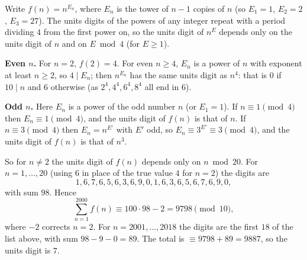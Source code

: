 Write $f(n)=n^{E_n}$, where $E_n$ is the tower of $n-1$ copies of $n$ (so $E_1=1$, $E_2=2$, $E_3=27$). The units digits of the powers of any integer repeat with a period dividing $4$ from the first power on, so the units digit of $n^{E}$ depends only on the units digit of $n$ and on $E\bmod4$ (for $E\ge1$).

\textbf{Even $n$.} For $n=2$, $f(2)=4$. For even $n\ge4$, $E_n$ is a power of $n$ with exponent at least $n\ge2$, so $4\mid E_n$; then $n^{E_n}$ has the same units digit as $n^4$: that is $0$ if $10\mid n$ and $6$ otherwise (as $2^4,4^4,6^4,8^4$ all end in $6$).

\textbf{Odd $n$.} Here $E_n$ is a power of the odd number $n$ (or $E_1=1$). If $n\equiv1\pmod4$ then $E_n\equiv1\pmod4$, and the units digit of $f(n)$ is that of $n$. If $n\equiv3\pmod4$ then $E_n=n^{E'}$ with $E'$ odd, so $E_n\equiv3^{E'}\equiv3\pmod4$, and the units digit of $f(n)$ is that of $n^3$.

So for $n\ne2$ the units digit of $f(n)$ depends only on $n\bmod20$. For $n=1,\dots,20$ (using $6$ in place of the true value $4$ for $n=2$) the digits are
\[
1,6,7,6,5,6,3,6,9,0,1,6,3,6,5,6,7,6,9,0,
\]
with sum $98$. Hence
\[
\sum_{n=1}^{2000}f(n)\equiv100\cdot98-2=9798\pmod{10},
\]
where $-2$ corrects $n=2$. For $n=2001,\dots,2018$ the digits are the first $18$ of the list above, with sum $98-9-0=89$. The total is $\equiv9798+89=9887$, so the units digit is $\boxed{7}$.
